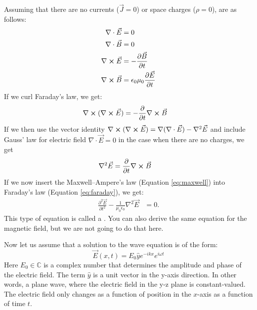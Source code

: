 Assuming that there are no currents ($\vec{J}=0$) or space charges ($\rho=0$),
 are as follows:
\begin{align}
  \nabla \cdot \vec{E}  & = 0                                                                       \\
  \nabla \cdot \vec{B}  & = 0                                                                       \\
  \nabla \cross \vec{E} & = -\frac{\partial \vec{B}}{\partial t} \label{eq:faraday}                 \\
  \nabla \cross \vec{B} & = \epsilon_0 \mu_0 \frac{\partial \vec{E}}{\partial t} \label{eq:maxwell}
\end{align}
If we curl Faraday's law, we get:
\begin{align}
  \nabla \cross (\nabla \cross \vec{E}) & = -\frac{\partial }{\partial t}\nabla \cross \vec{B}
\end{align}
If we then use the vector identity
$\nabla \cross (\nabla \cross \vec{E}) = \nabla(\nabla \cdot \vec{E}) - \nabla^2 \vec{E}$
and include Gauss' law for electric field $\nabla \cdot \vec{E} = 0$
in the case when there are no charges, we get
\begin{align}
  \nabla^2 \vec{E} & = \frac{\partial }{\partial t}\nabla \cross \vec{B}
\end{align}
If we now insert the Maxwell–Ampere's law (Equation \ref{eq:maxwell}) into Faraday's
law (Equation \ref{eq:faraday}), we get:
\begin{align}
  \frac{\partial^2 \vec{E}}{\partial t^2} - \frac{1}{\mu_0 \epsilon_0} \nabla^2 \vec{E} & = 0.
\end{align}
This type of equation is called a . You can also derive
the same equation for the magnetic field, but we are not going to do that here.

Now let us assume that a solution to the wave equation is of the form:
\begin{equation}
  \vec{E}(x,t)= E_0 \hat{y} e^{-i k x}e^{i\omega t}
  \label{efieldplanewave}
\end{equation}
Here $E_0 \in \mathbb{C}$ is a complex number that determines the amplitude and phase of the
electric field. The term $\hat{y}$ is a unit vector in the y-axis direction.
In other words, a plane wave, where the electric field in the y-z plane is constant-valued.
The electric field only changes as a function of position in the $x$-axis as a function of time $t$.

